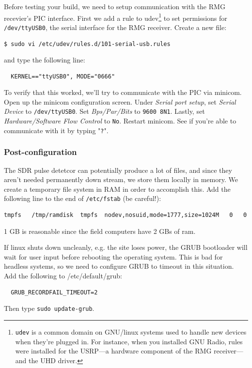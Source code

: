 \documentclass[letter]{article}
\newcounter{foot}
\begin{document}
Before testing your build, we need to setup communication with the RMG recevier's PIC interface. First we 
add a rule to udev\footnote{\texttt{udev} is a common domain on GNU/linux systems used to handle 
new devices when they're plugged in. For instance, when you installed GNU Radio, rules were installed 
for the USRP---a hardware component of the RMG receiver---and the UHD driver.} to set permissions for 
\texttt{/dev/ttyUSB0}, the serial interface for the RMG receiver. Create a new file: 
\begin{verbatim}
$ sudo vi /etc/udev/rules.d/101-serial-usb.rules
\end{verbatim}
and type the following line: 
\begin{verbatim}
  KERNEL=="ttyUSB0", MODE="0666"
\end{verbatim}
To verify that this worked, we'll try to communicate with the PIC via minicom. Open up the minicom
configuration screen. Under \textit{Serial port setup}, set \textit{Serial Device} to \texttt{/dev/ttyUSB0}.
Set \textit{Bps/Par/Bits} to \texttt{9600 8N1}. Lastly, set \textit{Hardware/Software Flow Control} to 
\texttt{No}. Restart minicom. See if you're able to communicate with it by typing "\texttt{?}".  

\subsubsection{Post-configuration} 

The SDR pulse detetcor can potentially produce a lot of files, and since they aren't needed 
permanently down stream, we store them locally in memory. We create a temporary file system 
in RAM in order to accomplish this. Add the following line to the end of \texttt{/etc/fstab} (be careful!): 
\begin{verbatim}
tmpfs   /tmp/ramdisk  tmpfs  nodev,nosuid,mode=1777,size=1024M   0   0
\end{verbatim}
1 GB is reasonable since the field computers have 2 GBs of ram. 

If linux shuts down uncleanly, e.g. the site loses power, the GRUB bootloader will wait for user 
input before rebooting the operating system. This is bad for headless systems, so we need to 
configure GRUB to timeout in this situation. Add the following to /etc/default/grub: 
\begin{verbatim}
  GRUB_RECORDFAIL_TIMEOUT=2
\end{verbatim}
Then type \texttt{sudo update-grub}. 
\end{document}
